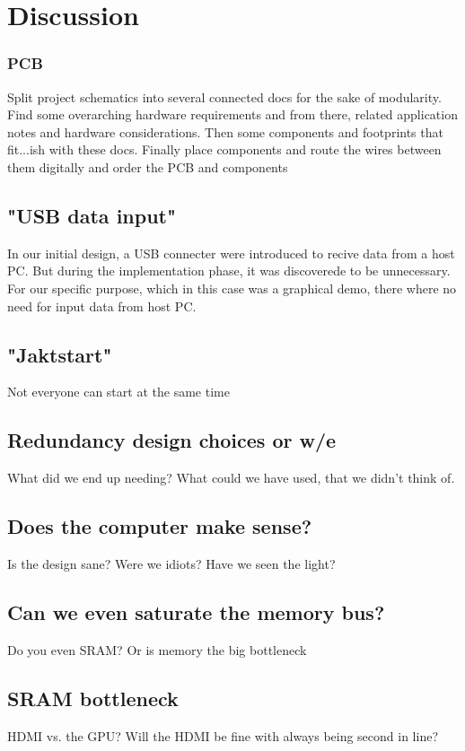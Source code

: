 \documentclass[../main/report.tex]{subfiles}
\begin{document}
\chapter{Discussion}



\subsection{PCB}
Split project schematics into several connected docs for the sake of modularity. Find some overarching hardware requirements and from there, related application notes and hardware considerations. Then some components and footprints that fit...ish with these docs.
Finally place components and route the wires between them digitally and order the PCB and components

\section{"USB data input"}
In our initial design, a USB connecter were introduced to recive data from a host PC. 
But during the implementation phase, it was discoverede to be unnecessary.
For our specific purpose, which in this case was a graphical demo, there where no need for input data from host PC. 

\section{"Jaktstart"}

Not everyone can start at the same time

\section{Redundancy design choices or w/e}
What did we end up needing?
What could we have used, that we didn't think of.

\section{Does the computer make sense?}
Is the design sane?
Were we idiots?
Have we seen the light?

\section{Can we even saturate the memory bus?}
Do you even SRAM?
Or is memory the big bottleneck

\section{SRAM bottleneck}
HDMI vs. the GPU?
Will the HDMI be fine with always being second in line?
\end{document}
